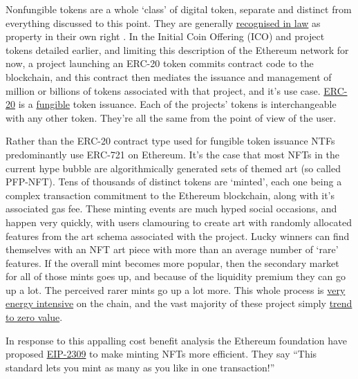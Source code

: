 Nonfungible tokens are a whole `class' of digital token, separate and distinct from everything discussed to this point. They are generally \href{https://www.signaturelitigation.com/nfts-recognised-as-property-lavinia-deborah-osbourne-v-1-persons-unknown-2-ozone-networks-inc-trading-as-opensea/}{recognised in law} as property in their own right \cite{moringiello2021property, fairfield2021tokenized}. In the Initial Coin Offering (ICO) and project tokens detailed earlier, and limiting this description of the Ethereum network for now, a project launching an ERC-20 token commits contract code to the blockchain, and this contract then mediates the issuance and management of million or billions of tokens associated with that project, and it's use case. \href{https://ethereum.org/en/developers/docs/standards/tokens/erc-20/}{ERC-20} is a \href{https://en.wikipedia.org/wiki/Fungibility}{fungible} token issuance. Each of the projects' tokens is interchangeable with any other token. They're all the same from the point of view of the user.\par
Rather than the ERC-20 contract type used for fungible token issuance NTFs predominantly use ERC-721 on Ethereum. It's the case that most NFTs in the current hype bubble are algorithmically generated sets of themed art (so called PFP-NFT). Tens of thousands of distinct tokens are `minted', each one being a complex transaction commitment to the Ethereum blockchain, along with it's associated gas fee. These minting events are much hyped social occasions, and happen very quickly, with users clamouring to create art with randomly allocated features from the art schema associated with the project. Lucky winners can find themselves with an NFT art piece with more than an average number of `rare' features. If the overall mint becomes more popular, then the secondary market for all of those mints goes up, and because of the liquidity premium they can go up a lot. The perceived rarer mints go up a lot more. This whole process is \href{https://memoakten.medium.com/the-unreasonable-ecological-cost-of-cryptoart-2221d3eb2053}{very energy intensive} on the chain, and the vast majority of these project simply \href{https://www.turing.ac.uk/blog/non-fungible-tokens-can-we-predict-price-theyll-sell}{trend to zero value}. \par
In response to this appalling cost benefit analysis the Ethereum foundation have proposed \href{https://eips.ethereum.org/EIPS/eip-2309}{EIP-2309} to make minting NFTs more efficient. They say ``This standard lets you mint as many as you like in one transaction!''\par
